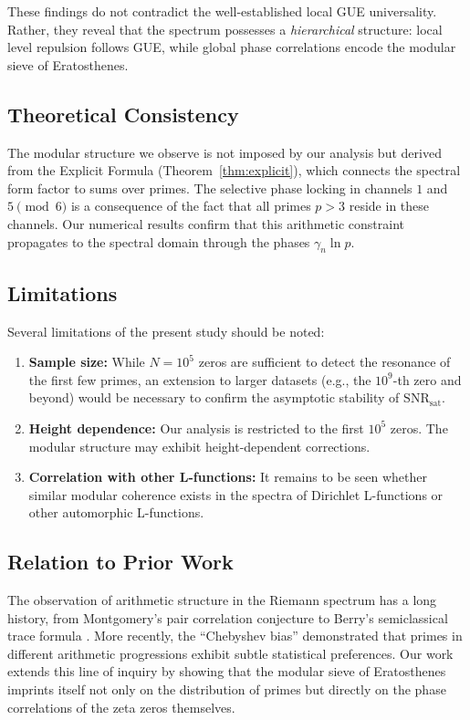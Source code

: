 \documentclass[12pt,a4paper]{article}
\theoremstyle{plain}
\theoremstyle{definition}
\theoremstyle{remark}
\begin{document}
These findings do not contradict the well-established local GUE universality. Rather, they reveal that the spectrum possesses a \emph{hierarchical} structure: local level repulsion follows GUE, while global phase correlations encode the modular sieve of Eratosthenes.

\subsection{Theoretical Consistency}
The modular structure we observe is not imposed by our analysis but derived from the Explicit Formula (Theorem~\ref{thm:explicit}), which connects the spectral form factor to sums over primes. The selective phase locking in channels \(1\) and \(5 \pmod{6}\) is a consequence of the fact that all primes \(p>3\) reside in these channels. Our numerical results confirm that this arithmetic constraint propagates to the spectral domain through the phases \(\gamma_n \ln p\).

\subsection{Limitations}
Several limitations of the present study should be noted:
\begin{enumerate}[label=(\roman*)]
    \item \textbf{Sample size:} While \(N=10^5\) zeros are sufficient to detect the resonance of the first few primes, an extension to larger datasets (e.g., the \(10^9\)-th zero and beyond) would be necessary to confirm the asymptotic stability of \(\mathrm{SNR}_{\mathrm{sat}}\).
    \item \textbf{Height dependence:} Our analysis is restricted to the first \(10^5\) zeros. The modular structure may exhibit height-dependent corrections.
    \item \textbf{Correlation with other L-functions:} It remains to be seen whether similar modular coherence exists in the spectra of Dirichlet L-functions or other automorphic L-functions.
\end{enumerate}

\subsection{Relation to Prior Work}
The observation of arithmetic structure in the Riemann spectrum has a long history, from Montgomery's pair correlation conjecture \cite{montgomery1973} to Berry's semiclassical trace formula \cite{berry1985}. More recently, the ``Chebyshev bias'' \cite{rubinstein1994} demonstrated that primes in different arithmetic progressions exhibit subtle statistical preferences. Our work extends this line of inquiry by showing that the modular sieve of Eratosthenes imprints itself not only on the distribution of primes but directly on the phase correlations of the zeta zeros themselves.
\end{document}
